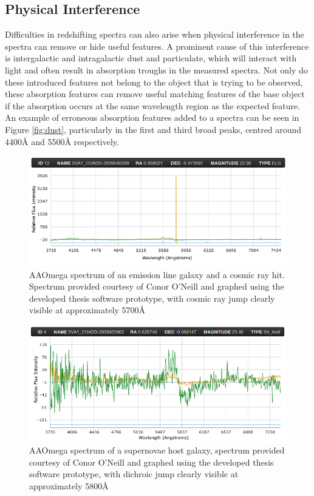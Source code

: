 \documentclass[titlesmallcaps, examinerscopy, copyrightpage]{uqthesis}
\begin{document}
\subsection{Physical Interference}

Difficulties in redshifting spectra can also arise when physical interference in the spectra can remove or hide useful features. A prominent cause of this interference is intergalactic and intragalactic dust and particulate, which will interact with light and often result in absorption troughs in the measured spectra. Not only do these introduced features not belong to the object that is trying to be observed, these absorption features can remove useful matching features of the base object if the absorption occurs at the same wavelength region as the expected feature. An example of erroneous absorption features added to a spectra can be seen in Figure \ref{fig:dust}, particularly in the first and third broad peaks, centred around 4400{\AA} and 5500{\AA} respectively.




\begin{figure}[ht!]
\includegraphics[width=1\textwidth]{images/CosmicRay.PNG} 
\centering
\caption{AAOmega spectrum of an emission line galaxy and a cosmic ray hit. Spectrum provided courtesy of Conor O'Neill and graphed using the developed thesis software prototype, with cosmic ray jump clearly visible at approximately 5700{\AA}}
\label{fig:cosmic}
\end{figure}

\begin{figure}[ht!]
\includegraphics[width=1\textwidth]{images/jump.PNG} 
\centering
\caption{AAOmega spectrum of a supernovae host galaxy, spectrum provided courtesy of Conor O'Neill and graphed using the developed thesis software prototype, with dichroic jump clearly visible at approximately 5800{\AA}}
\label{fig:jump}
\end{figure}
\end{document}
